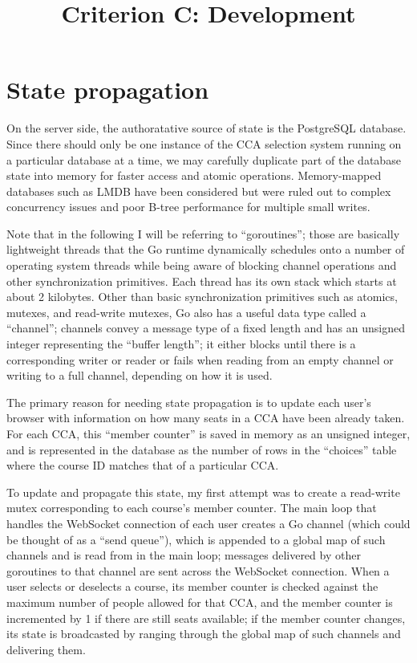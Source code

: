 

\title{Criterion C: Development}


\maketitle


\section{State propagation}

On the server side, the authoratative source of state is the
PostgreSQL database. Since there should only be one instance of the
CCA selection system running on a particular database at a time, we
may carefully duplicate part of the database state into memory for
faster access and atomic operations. Memory-mapped databases such
as LMDB have been considered but were ruled out to complex
concurrency issues and poor B-tree performance for multiple small
writes.

Note that in the following I will be referring to ``goroutines'';
those are basically lightweight threads that the Go runtime
dynamically schedules onto a number of operating system threads while
being aware of blocking channel operations and other synchronization
primitives. Each thread has its own stack which starts at about 2
kilobytes. Other than basic synchronization primitives such as
atomics, mutexes, and read-write mutexes, Go also has a useful data
type called a ``channel''; channels convey a message type of a fixed
length and has an unsigned integer representing the ``buffer length'';
it either blocks until there is a corresponding writer or reader or
fails when reading from an empty channel or writing to a full channel,
depending on how it is used.

The primary reason for needing state propagation is to update each
user's browser with information on how many seats in a CCA have been
already taken. For each CCA, this ``member counter'' is saved in
memory as an unsigned integer, and is represented in the database as
the number of rows in the ``choices'' table where the course ID
matches that of a particular CCA.

To update and propagate this state, my first attempt was to create a
read-write mutex corresponding to each course's member counter.  The
main loop that handles the WebSocket connection of each user creates a
Go channel (which could be thought of as a ``send queue''), which is
appended to a global map of such channels and is read from in the main
loop; messages delivered by other goroutines to that channel are sent
across the WebSocket connection. When a user selects or deselects a
course, its member counter is checked against the maximum number of
people allowed for that CCA, and the member counter is incremented by
1 if there are still seats available; if the member counter changes,
its state is broadcasted by ranging through the global map of such
channels and delivering them.

